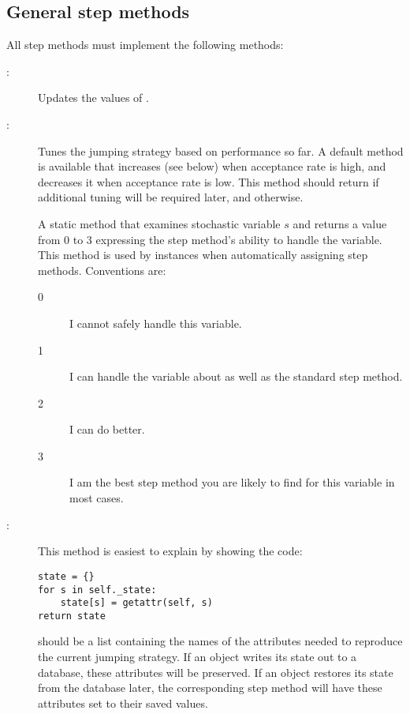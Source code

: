 \hypertarget{user-gen}{}
\subsection*{General step methods} \label{user-gen}

All step methods must implement the following methods:
\begin{description}
   \item[:] Updates the values of .
   \item[:] Tunes the jumping strategy based on performance so far. A default method is available that increases  (see below) when acceptance rate is high, and decreases it when acceptance rate is low. This method should return  if additional tuning will be required later, and  otherwise.
   \item[] A static method that examines stochastic variable $s$ and returns a value from 0 to 3 expressing the step method's ability to handle the variable. This method is used by  instances when automatically assigning step methods. Conventions are:
   \begin{description}
      \item[0] I cannot safely handle this variable. 
      \item[1] I can handle the variable about as well as the standard  step method.
      \item[2] I can do better.
      \item[3] I am the best step method you are likely to find for this variable in most cases.
   \end{description}
   \item[:] This method is easiest to explain by showing the code:
   \begin{verbatim}
state = {}
for s in self._state:
    state[s] = getattr(self, s)
return state      
   \end{verbatim}
    should be a list containing the names of the attributes needed to reproduce the current jumping strategy. If an  object writes its state out to a database, these attributes will be preserved. If an  object restores its state from the database later, the corresponding step method will have these attributes set to their saved values.
\end{description}

